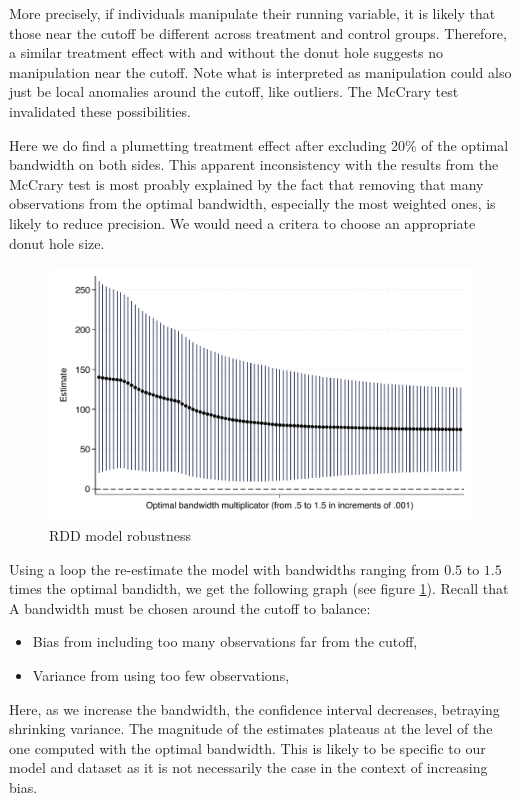\documentclass{article}
\begin{document}
More precisely, if individuals manipulate their running variable, it is likely that those near the cutoff be different across treatment and control groups. Therefore, a similar treatment effect with and without the donut hole suggests no manipulation near the cutoff. Note what is interpreted as manipulation could also just be local anomalies around the cutoff, like outliers. The McCrary test invalidated these possibilities.

Here we do find a plumetting treatment effect after excluding 20\% of the optimal bandwidth on both sides. This apparent inconsistency with the results from the McCrary test is most proably explained by the fact that removing that many observations from the optimal bandwidth, especially the most weighted ones, is likely to reduce precision. We would need a critera to choose an appropriate donut hole size.



\begin{figure}[H]
    \centering
    \includegraphics[scale=0.8]{../outputs/model2_robustness_plot.pdf}
    \caption{RDD model robustness}
    \label{fig:model2-robustness}
\end{figure}

Using a loop the re-estimate the model with bandwidths ranging from \(0.5\) to \(1.5\) times the optimal bandidth, we get the following graph (see figure \ref{fig:model2-robustness}). Recall that A bandwidth must be chosen around the cutoff to balance:
\begin{itemize}
    \item Bias from including too many observations far from the cutoff,
    \item Variance from using too few observations,
\end{itemize}
Here, as we increase the bandwidth, the confidence interval decreases, betraying shrinking variance. The magnitude of the estimates plateaus at the level of the one computed with the optimal bandwidth. This is likely to be specific to our model and dataset as it is not necessarily the case in the context of increasing bias. 
\end{document}
